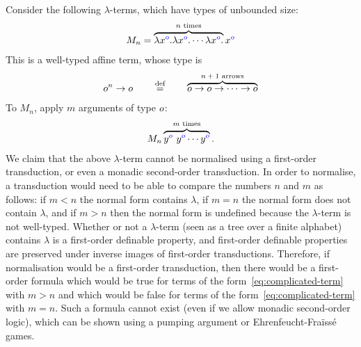 \begin{example}\label{ex:affine-not-enough}
Consider the following $\lambda$-terms, which have types of 
unbounded size: 
\begin{align*}
M_n = \overbrace{\lambda {x}^{\color{blue}{o}}. \lambda {x}^{\color{blue}{o}}. \cdots \lambda {x}^{\color{blue}{o}}.}^{\text{$n$ times}} {x}^{\color{blue}{o}}
\end{align*}
This is a well-typed affine term, whose type is 
\begin{align*}
o^n \to o \qquad \stackrel{\text{def}}= \qquad  \overbrace{o \to o \to \cdots \to o}^{\text{$n+1$ arrows}}
\end{align*}
    To $M_n$, apply  $m$ arguments of type $o$:
    \begin{align}\label{eq:complicated-term}
    M_n \overbrace{{y}^{\color{blue}{o}} \ {y}^{\color{blue}{o}} \cdots {y}^{\color{blue}{o}} }^{\text{$m$ times}}.
    \end{align}
    We claim that the above $\lambda$-term cannot be normalised using a first-order transduction, or even a monadic second-order transduction. In order to normalise, a transduction would need to be able to compare the numbers $n$ and $m$ as follows:  if $m < n$  the normal form contains $\lambda$, if $m=n$  the normal form does not contain $\lambda$, and if $m > n$ then the normal form is undefined because the $\lambda$-term is not well-typed.  Whether or not a $\lambda$-term (seen as a tree over a finite alphabet) contains $\lambda$ is a first-order definable property, and first-order definable properties are preserved under inverse images of first-order transductions. Therefore, if normalisation would be a first-order transduction,
then there would be a first-order formula which would be true for terms of the form~\eqref{eq:complicated-term} with $m>n$ and which would be false for terms of the form~\eqref{eq:complicated-term} with $m=n$. Such a formula cannot exist (even if we allow monadic second-order logic), which can be shown using a pumping argument or Ehrenfeucht-Fra\"iss\'e games. 


\end{example}

